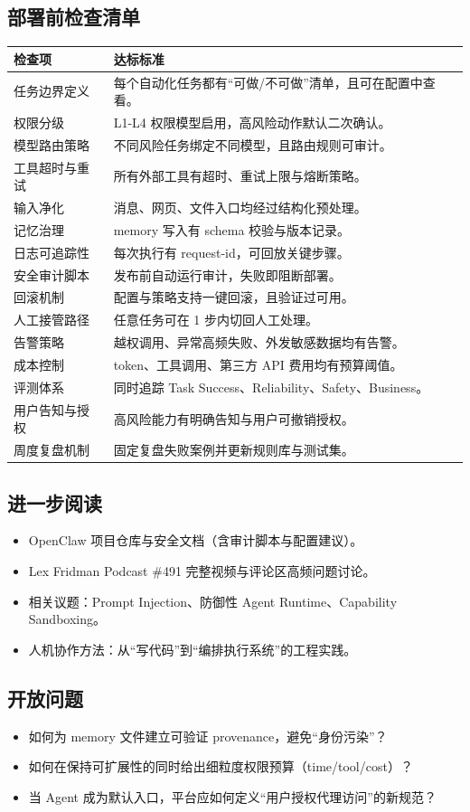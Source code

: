 \subsection{部署前检查清单}
\begin{longtable}{p{}p{}}
\toprule
\textbf{检查项} & \textbf{达标标准} \\
\midrule
任务边界定义 & 每个自动化任务都有“可做/不可做”清单，且可在配置中查看。 \\
\midrule
权限分级 & L1-L4 权限模型启用，高风险动作默认二次确认。 \\
\midrule
模型路由策略 & 不同风险任务绑定不同模型，且路由规则可审计。 \\
\midrule
工具超时与重试 & 所有外部工具有超时、重试上限与熔断策略。 \\
\midrule
输入净化 & 消息、网页、文件入口均经过结构化预处理。 \\
\midrule
记忆治理 & memory 写入有 schema 校验与版本记录。 \\
\midrule
日志可追踪性 & 每次执行有 request-id，可回放关键步骤。 \\
\midrule
安全审计脚本 & 发布前自动运行审计，失败即阻断部署。 \\
\midrule
回滚机制 & 配置与策略支持一键回滚，且验证过可用。 \\
\midrule
人工接管路径 & 任意任务可在 1 步内切回人工处理。 \\
\midrule
告警策略 & 越权调用、异常高频失败、外发敏感数据均有告警。 \\
\midrule
成本控制 & token、工具调用、第三方 API 费用均有预算阈值。 \\
\midrule
评测体系 & 同时追踪 Task Success、Reliability、Safety、Business。 \\
\midrule
用户告知与授权 & 高风险能力有明确告知与用户可撤销授权。 \\
\midrule
周度复盘机制 & 固定复盘失败案例并更新规则库与测试集。 \\
\bottomrule
\end{longtable}

\subsection{进一步阅读}
\begin{itemize}
    \item OpenClaw 项目仓库与安全文档（含审计脚本与配置建议）。
    \item Lex Fridman Podcast \#491 完整视频与评论区高频问题讨论。
    \item 相关议题：Prompt Injection、防御性 Agent Runtime、Capability Sandboxing。
    \item 人机协作方法：从“写代码”到“编排执行系统”的工程实践。
\end{itemize}

\subsection{开放问题}
\begin{itemize}
    \item 如何为 memory 文件建立可验证 provenance，避免“身份污染”？
    \item 如何在保持可扩展性的同时给出细粒度权限预算（time/tool/cost）？
    \item 当 Agent 成为默认入口，平台应如何定义“用户授权代理访问”的新规范？
\end{itemize}


